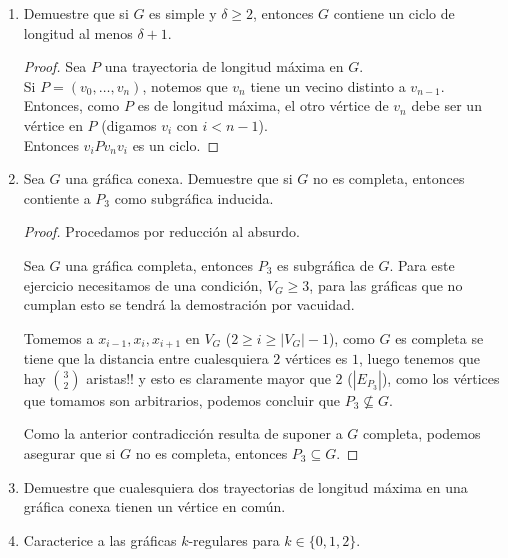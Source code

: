 \documentclass{article}
\begin{document}
\begin{enumerate}
\item Demuestre que si $G$ es simple y $\delta \ge 2$, entonces $G$ contiene
  un ciclo de longitud al menos $\delta + 1$.
  \renewcommand\qedsymbol{QED}
  \begin{proof}
    Sea $P$ una trayectoria de longitud máxima en $G$. \\
    Si $P = (v_{0}, \dots, v_{n})$, notemos que $v_{n}$ tiene un vecino distinto
    a $v_{n-1}$. \\
    Entonces, como $P$ es de longitud máxima, el otro vértice de $v_{n}$ debe ser
    un vértice en $P$ (digamos $v_{i}$ con $i < n-1$). \\
    Entonces $v_{i} P v_{n} v_{i}$ es un ciclo.
  \end{proof}
\item Sea $G$ una gr\'afica conexa.   Demuestre que si $G$ no es completa,
  entonces contiente a $P_3$ como subgr\'afica inducida.
  \renewcommand\qedsymbol{QED}
  \begin{proof}
    Procedamos por reducción al absurdo.

    Sea $G$ una gráfica completa, entonces $P_{3}$ es subgráfica de $G$. Para este
    ejercicio necesitamos de una condición, $V_G \ge 3$, para las gráficas que no
    cumplan esto se tendrá la demostración por vacuidad.

    Tomemos a $x_{i - 1}, x_{i}, x_{i + 1}$ en $V_{G}$ ($2 \ge i \ge
    |V_{G}| - 1$), como $G$ es completa se tiene que la distancia entre cualesquiera
    $2$ v\'ertices es $1$, luego tenemos que hay ${3 \choose 2}$ aristas!! y esto es
    claramente mayor que $2$ ($|E_{P_3}|$), como los v\'ertices que tomamos son arbitrarios,
    podemos concluir que $P_{3} \nsubseteq G$.

    Como la anterior contradicci\'on resulta de suponer a $G$ completa, podemos
    asegurar que si $G$ no es completa, entonces $P_3 \subseteq G$.
  \end{proof}
\item Demuestre que cualesquiera dos trayectorias de longitud m\'axima en una
  gr\'afica conexa tienen un vértice en común.
\item Caracterice a las gr\'aficas $k$-regulares para $k \in \{ 0, 1, 2 \}$.


\end{enumerate}
\end{document}
